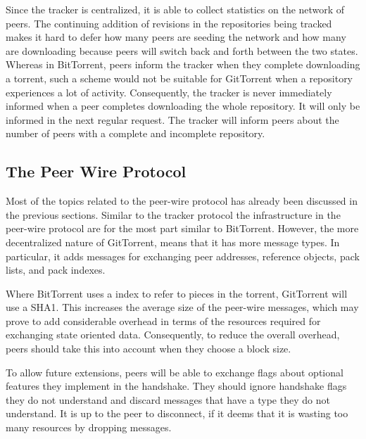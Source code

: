 Since the tracker is centralized, it is able to collect statistics on
the network of peers. The continuing addition of revisions in the
repositories being tracked makes it hard to defer how many peers are
seeding the network and how many are downloading because peers will
switch back and forth between the two states.  Whereas in BitTorrent,
peers inform the tracker when they complete downloading a torrent,
such a scheme would not be suitable for GitTorrent when a repository
experiences a lot of activity.  Consequently, the tracker is never
immediately informed when a peer completes downloading the whole
repository. It will only be informed in the next regular request. The
tracker will inform peers about the number of peers with a complete
and incomplete repository.

\subsection{The Peer Wire Protocol}
\label{sec:peer-wire}

Most of the topics related to the peer-wire protocol has already been
discussed in the previous sections. Similar to the tracker protocol
the infrastructure in the peer-wire protocol are for the most part
similar to BitTorrent. However, the more decentralized nature of
GitTorrent, means that it has more message types. In particular, it
adds messages for exchanging peer addresses, reference objects, pack lists, and
pack indexes.

Where BitTorrent uses a index to refer to pieces in the torrent,
GitTorrent will use a SHA1. This increases the average size of the
peer-wire messages, which may prove to add considerable overhead in
terms of the resources required for exchanging state oriented data.
Consequently, to reduce the overall overhead, peers should take this
into account when they choose a block size.

To allow future extensions, peers will be able to exchange flags about
optional features they implement in the handshake. They
should ignore handshake flags they do not understand and discard
messages that have a type they do not understand. It is up to the peer
to disconnect, if it deems that it is wasting too many resources by
dropping messages.


% 
% 

